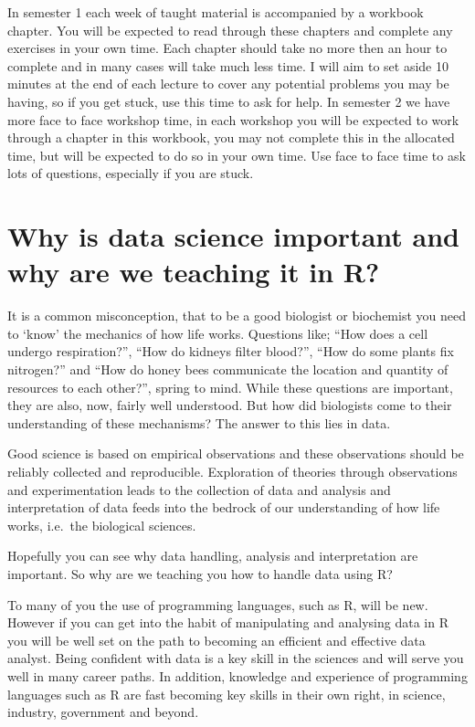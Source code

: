 \documentclass[
]{book}
\begin{document}
In semester 1 each week of taught material is accompanied by a workbook chapter. You will be expected to read through these chapters and complete any exercises in your own time. Each chapter should take no more then an hour to complete and in many cases will take much less time. I will aim to set aside 10 minutes at the end of each lecture to cover any potential problems you may be having, so if you get stuck, use this time to ask for help. In semester 2 we have more face to face workshop time, in each workshop you will be expected to work through a chapter in this workbook, you may not complete this in the allocated time, but will be expected to do so in your own time. Use face to face time to ask lots of questions, especially if you are stuck.

\section{Why is data science important and why are we teaching it in R?}\label{why-is-data-science-important-and-why-are-we-teaching-it-in-r}

It is a common misconception, that to be a good biologist or biochemist you need to `know' the mechanics of how life works. Questions like; ``How does a cell undergo respiration?'', ``How do kidneys filter blood?'', ``How do some plants fix nitrogen?'' and ``How do honey bees communicate the location and quantity of resources to each other?'', spring to mind. While these questions are important, they are also, now, fairly well understood. But how did biologists come to their understanding of these mechanisms? The answer to this lies in data.

Good science is based on empirical observations and these observations should be reliably collected and reproducible. Exploration of theories through observations and experimentation leads to the collection of data and analysis and interpretation of data feeds into the bedrock of our understanding of how life works, i.e.~the biological sciences.

Hopefully you can see why data handling, analysis and interpretation are important. So why are we teaching you how to handle data using R?

To many of you the use of programming languages, such as R, will be new. However if you can get into the habit of manipulating and analysing data in R you will be well set on the path to becoming an efficient and effective data analyst. Being confident with data is a key skill in the sciences and will serve you well in many career paths. In addition, knowledge and experience of programming languages such as R are fast becoming key skills in their own right, in science, industry, government and beyond.
\end{document}
